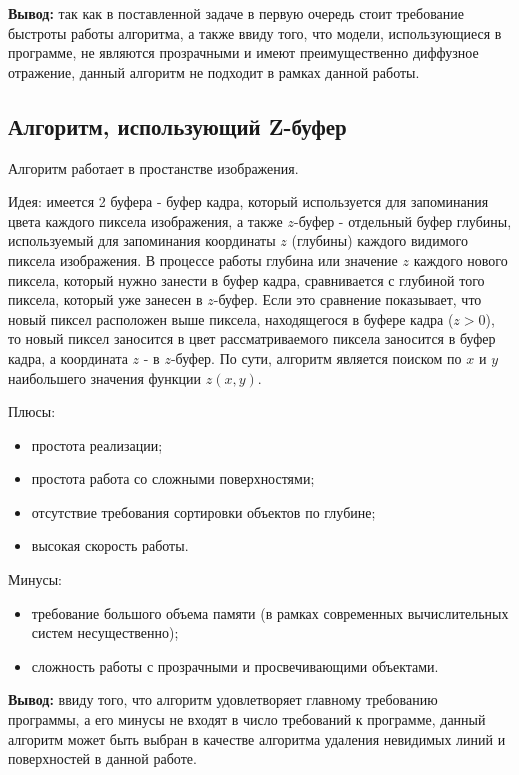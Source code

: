 \textbf{Вывод:} так как в поставленной задаче в первую очередь стоит требование быстроты работы алгоритма, а также ввиду того, что модели, использующиеся в программе, не являются прозрачными и имеют преимущественно диффузное отражение, данный алгоритм не подходит в рамках данной работы.

\subsection{Алгоритм, использующий Z-буфер}
Алгоритм работает в простанстве изображения.

Идея: имеется 2 буфера - буфер кадра, который используется для запоминания цвета каждого пиксела изображения, а также $z$-буфер - отдельный буфер глубины, используемый для запоминания координаты $z$ (глубины) каждого видимого пиксела изображения. В процессе работы глубина или значение $z$ каждого нового пиксела, который нужно занести в буфер кадра, сравнивается с глубиной того пиксела, который уже занесен в $z$-буфер. Если это сравнение показывает, что новый пиксел расположен выше пиксела, находящегося в буфере кадра ($z > 0$), то новый пиксел заносится в цвет рассматриваемого пиксела заносится в буфер кадра, а координата $z$ - в $z$-буфер. По сути, алгоритм является поиском по $x$ и $y$ наибольшего значения функции $z(x, y)$.

Плюсы:
\begin{itemize}
    \item простота реализации;
    \item простота работа со сложными поверхностями;
    \item отсутствие требования сортировки объектов по глубине;
    \item высокая скорость работы.
\end{itemize}

Минусы:
\begin{itemize}
    \item требование большого объема памяти (в рамках современных вычислительных систем несущественно);
    \item сложность работы с прозрачными и просвечивающими объектами.
\end{itemize}

\textbf{Вывод:} ввиду того, что алгоритм удовлетворяет главному требованию программы, а его минусы не входят в число требований к программе, данный алгоритм может быть выбран в качестве алгоритма удаления невидимых линий и поверхностей в данной работе.

